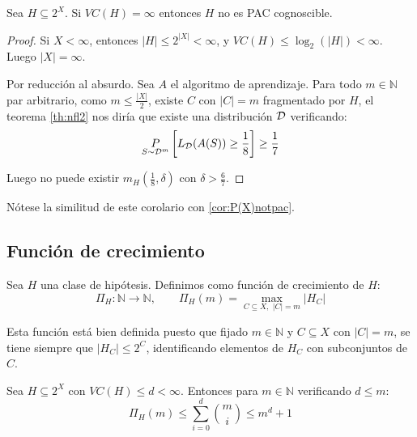 \begin{corollary}
 Sea $H \subseteq 2^X$. Si $VC(H) = \infty$ entonces $H$ no es PAC cognoscible.
 \label{cor:vc-finito}
\end{corollary}

  \begin{proof}
  Si $X < \infty$, entonces $|H| \le 2^{|X|} < \infty$, y $VC(H) \le \log_2(|H|) < \infty$. Luego $|X| = \infty$.
  
  Por reducción al absurdo. Sea $A$ el algoritmo de aprendizaje. Para todo $m\in \mathbb{N}$ par arbitrario, como 
  $m\le \frac{|X|}{2}$, existe $C$ con $|C| = m$ fragmentado por $H$, el teorema \ref{th:nfl2} nos diría que existe una 
  distribución $\mathcal{D}$ verificando:
  \[
    \underset{S\sim \mathcal{D}^m}{P} \left[ L_{\mathcal{D}}(A(S)) \ge \frac{1}{8} \right] \ge \frac{1}{7}
  \]
 
  Luego no puede existir $m_H \left(\frac{1}{8}, \delta\right)$ con $\delta > \frac{6}{7}$.
  \end{proof}

Nótese la similitud de este corolario con \ref{cor:P(X)notpac}.

\subsection{Función de crecimiento}
\begin{definition}
Sea $H$ una clase de hipótesis. Definimos como función de crecimiento de $H$:
\[
  \Pi_{H}: \mathbb{N} \longrightarrow \mathbb{N}, \qquad \Pi_{H}(m) = \max_{C \subseteq X, \,\, |C|=m} |H_C|
\]
\end{definition}

Esta función está bien definida puesto que fijado $m \in \mathbb{N}$ y $C\subseteq X$ con $|C| = m$, se tiene siempre 
que $|H_C| \le 2^C$, identificando elementos de $H_C$ con subconjuntos de $C$.

\begin{lemma}
Sea $H \subseteq 2^X$ con $VC(H) \le d < \infty$. Entonces para $m\in \mathbb{N}$ verificando $d\le m$:
\[
  \Pi_{H} (m) \le \sum_{i=0}^d \binom{m}{i} \le m^d + 1
\]
\label{lemma:sauer}
\end{lemma}


